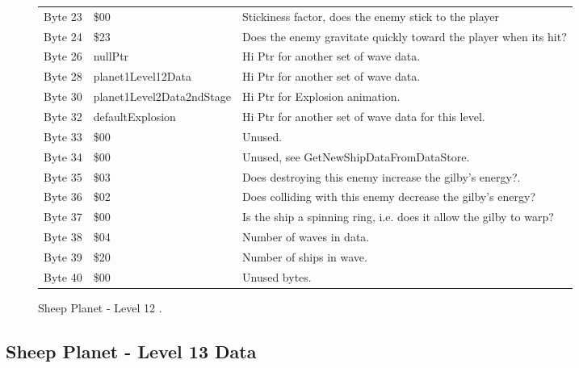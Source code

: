 \begin{figure}[H]
{\begin{adjustbox}{width=12cm}
\begin{tabular}{lll}
 Byte 23 & \$00                       & Stickiness factor, does the enemy stick to the player              \\
 Byte 24 & \$23                       & Does the enemy gravitate quickly toward the player when its hit?   \\
 Byte 26 & nullPtr                   & Hi Ptr for another set of wave data.                               \\
 Byte 28 & planet1Level12Data        & Hi Ptr for another set of wave data.                               \\
 Byte 30 & planet1Level2Data2ndStage & Hi Ptr for Explosion animation.                                    \\
 Byte 32 & defaultExplosion          & Hi Ptr for another set of wave data for this level.                \\
 Byte 33 & \$00                       & Unused.                                                            \\
 Byte 34 & \$00                       & Unused, see GetNewShipDataFromDataStore.                           \\
 Byte 35 & \$03                       & Does destroying this enemy increase the gilby's energy?.           \\
 Byte 36 & \$02                       & Does colliding with this enemy decrease the gilby's energy?        \\
 Byte 37 & \$00                       & Is the ship a spinning ring, i.e. does it allow the gilby to warp? \\
 Byte 38 & \$04                       & Number of waves in data.                                           \\
 Byte 39 & \$20                       & Number of ships in wave.                                           \\
 Byte 40 & \$00                       & Unused bytes.                                                      \\
\bottomrule
\end{tabular}

  \end{adjustbox}

  }\caption*{Sheep Planet - Level 12
.}
\end{figure}

\clearpage
\subsection{Sheep Planet - Level 13 Data}

